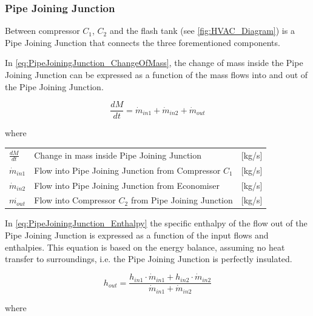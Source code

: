 \subsubsection{Pipe Joining Junction} 
Between compressor $ C_1 $, $ C_2 $ and the flash tank (see \cref{fig:HVAC_Diagram}) is a Pipe Joining Junction that connects the three forementioned components.

In \cref{eq:PipeJoiningJunction_ChangeOfMass}, the change of mass inside the Pipe Joining Junction can be expressed as a function of the mass flows into and out of the Pipe Joining Junction. 

\begin{equation} \label{eq:PipeJoiningJunction_ChangeOfMass}
	\frac{dM}{dt} = \dot{m}_{in1} + \dot{m}_{in2} + \dot{m}_{out}
\end{equation}

where 

\begin{center}
	\begin{tabular}{l p{8cm} l}
		$\frac{dM}{dt}$ & Change in mass inside Pipe Joining Junction		 	& [\si{kg}/\si{s}]\\ 
		$\dot{m}_{in1}$ & Flow into Pipe Joining Junction from Compressor $ C_1 $ 		& [\si{kg}/\si{s}]\\
		$\dot{m}_{in2}$ & Flow into Pipe Joining Junction from Economiser 				& [\si{kg}/\si{s}]\\
		$\dot{m_{out}}$ & Flow into Compressor $ C_2 $ from Pipe Joining Junction		& [\si{kg}/\si{s}]\\
	\end{tabular}
\end{center}

In \cref{eq:PipeJoiningJunction_Enthalpy} the specific enthalpy of the flow out of the Pipe Joining Junction is expressed as a function of the input flows and enthalpies. This equation is based on the energy balance, assuming no heat transfer to surroundings, i.e. the Pipe Joining Junction is perfectly insulated.

\begin{equation} \label{eq:PipeJoiningJunction_Enthalpy}
	h_{out} = \frac{h_{in1} \cdot \dot{m}_{in1} + h_{in2} \cdot \dot{m}_{in2}}{ \dot{m}_{in1} + \dot{m}_{in2} }
\end{equation}

where

